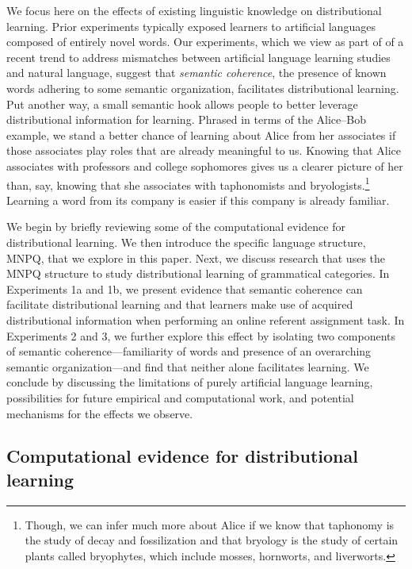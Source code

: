 \documentclass[man,floatsintext]{apa6}
\begin{document}
We focus here on the effects of existing linguistic knowledge on distributional learning. Prior experiments typically exposed learners to artificial languages composed of entirely novel words. Our experiments, which we view as part of  of a recent trend to address mismatches between artificial language learning studies and natural language, suggest that \emph{semantic coherence}, the presence of known words adhering to some semantic organization, facilitates distributional learning. Put another way, a small semantic hook allows people to better leverage distributional information for learning. Phrased in terms of the Alice--Bob example, we stand a better chance of learning about Alice from her associates if those associates play roles that are already meaningful to us. Knowing that Alice associates with professors and college sophomores gives us a clearer picture of her than, say, knowing that she associates with taphonomists and bryologists.\footnote{Though, we can infer much more about Alice if we know that taphonomy is the study of decay and fossilization and that bryology is the study of certain plants called bryophytes, which include mosses, hornworts, and liverworts.} Learning a word from its company is easier if this company is already familiar.

We begin by briefly reviewing some of the computational evidence for distributional learning. We then introduce the specific language structure, MNPQ, that we explore in this paper. Next, we discuss research that uses the MNPQ structure to study distributional learning of grammatical categories. In Experiments 1a and 1b, we present evidence that semantic coherence can facilitate distributional learning and that learners make use of acquired distributional information when performing an online referent assignment task. In Experiments 2 and 3, we further explore this effect by isolating two components of semantic coherence---familiarity of words and presence of an overarching semantic organization---and find that neither alone facilitates learning. We conclude by discussing the limitations of purely artificial language learning, possibilities for future empirical and computational work, and potential mechanisms for the effects we observe.

\subsection{Computational evidence for distributional learning}
\end{document}
